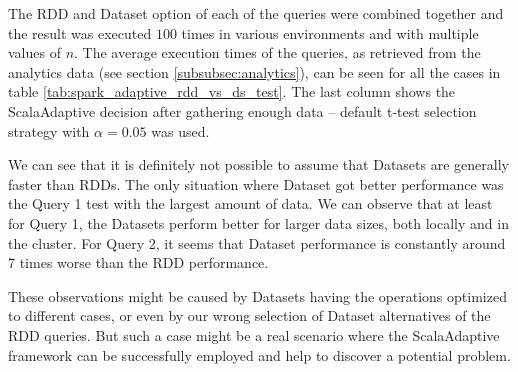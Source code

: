 The RDD and Dataset option of each of the queries were combined together and the result was executed $100$ times in various environments and with multiple values of $n$. The average execution times of the queries, as retrieved from the analytics data (see section \ref{subsubsec:analytics}), can be seen for all the cases in table \ref{tab:spark_adaptive_rdd_vs_ds_test}. The last column shows the ScalaAdaptive decision after gathering enough data -- default t-test selection strategy with $\alpha = 0.05$ was used.

We can see that it is definitely not possible to assume that Datasets are generally faster than RDDs. The only situation where Dataset got better performance was the Query 1 test with the largest amount of data. We can observe that at least for Query 1, the Datasets perform better for larger data sizes, both locally and in the cluster. For Query 2, it seems that Dataset performance is constantly around 7 times worse than the RDD performance.

These observations might be caused by Datasets having the operations optimized to different cases, or even by our wrong selection of Dataset alternatives of the RDD queries. But such a case might be a real scenario where the ScalaAdaptive framework can be successfully employed and help to discover a potential problem.

